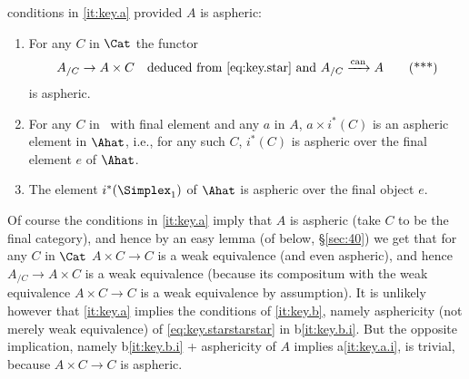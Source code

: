 \begin{theorem}
\begin{enumerate}[label=\alph*),font=\normalfont]
{      conditions in \textup{\ref{it:key.a}} provided $A$ is
      aspheric}:
    \begin{enumerate}[label=(\roman*),font=\normalfont]
    \item\label{it:key.b.i}
      For any $C$ in $\Cat$ the functor
      \begin{equation}
        \label{eq:key.starstarstar}
        A_{/C} \to A\times C\quad\text{deduced from
          \textup{\eqref{eq:key.star}} and
          $A_{/C}\xrightarrow{\textup{can}} A$}
        \tag{***}
      \end{equation}
      is aspheric.
    \item\label{it:key.b.ii}
      For any $C$ in \Cat\ with final element and any $a$ in $A$\kern1pt,
      $a\times i^*(C)$ is an aspheric element in $\Ahat$, i.e.,
      for any such $C$, $i^*(C)$ is aspheric over the final element
      $e$ of $\Ahat$.
    \item\label{it:key.b.iii}
      The element $i^*(\Simplex_1)$ of $\Ahat$ is aspheric over the
      final object $e$.
    \end{enumerate}
  \end{enumerate}
\end{theorem}

\begin{remark}
  Of course the conditions in \ref{it:key.a} imply that $A$ is
  aspheric (take $C$ to be the final category), and hence by an easy
  lemma (of below, \S\ref{sec:40}) we get that for any $C$ in $\Cat$ $A\times C\to C$ is a
  weak equivalence (and even aspheric), and hence $A_{/C}\to A\times
  C$ is a weak equivalence (because its compositum with the weak
  equivalence $A\times C\to C$ is a weak equivalence by
  assumption). It is unlikely however that \ref{it:key.a} implies the
  conditions of \ref{it:key.b}, namely asphericity (not merely weak
  equivalence) of \eqref{eq:key.starstarstar} in
  b\ref{it:key.b.i}. But the opposite implication, namely
  b\ref{it:key.b.i} + asphericity of $A$ implies a\ref{it:key.a.i}, is
  trivial, because $A\times C\to C$ is aspheric.
\end{remark}

